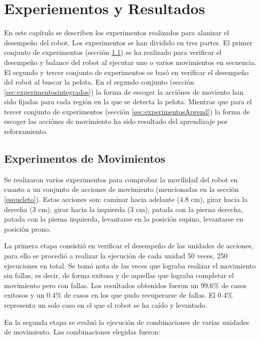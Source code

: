 \chapter{Experiementos y Resultados}\label{chapter:resultados}
En este capítulo se describen los experimentos realizados para alanizar el desempeño del robot. Los experimentos se han dividido en tres partes. El primer conjunto de experimentos (sección \ref{sec:experimentosMov}) se ha realizado para verificar el desempeño y balance del robot al ejecutar uno o varios movimientos en secuencia. El segundo y tercer conjunto de experimentos se bas\'o en verificar el desempeño del robot al buscar la pelota. En el segundo conjunto (sección \ref{sec:experimentosintegrados}) la forma de escoger la acciónes de moviento han sido fijadas para cada región en la que se detecta la pelota. Mientras que para el tercer conjunto de experimentos (secci\'on \ref{sec:experimentosAprend}) la forma de escoger las acci\'ones de movimiento ha sido resultado del aprendizaje por reforzamiento. 
 
\section{Experimentos de Movimientos}\label{sec:experimentosMov}

Se realizaron varios experimentos para comprobar la movilidad del robot en cuanto a un conjunto de acciones de movimiento (mencionadas en la sección \ref{esqueleto}). Estas acciones son: caminar hacia adelante (4.8 cm), girar hacia la derecha (3 cm), girar hacia la izquierda (3 cm), patada con la pierna derecha, patada con la pierna izquierda, levantarse en la posición supino, levantarse en posición prono.

La primera etapa consistió en verificar el desempeño de las unidades de acciones, para ello se procedió a realizar la ejecución de cada unidad 50 veces, 250 ejecuciones en total. Se tomó nota de las veces que lograba realizar el movimiento sin fallas, es decir, de forma exitosa y de aquellas que lograba completar el movimiento pero con fallas. Los resultados obtenidos fueron un 99.6\% de casos exitosos y un 0.4\% de casos en los que pudo recuperarse de fallas. El 0.4\% representa un solo caso en el que el robot se ha caído y levantado.  

En la segunda etapa se evalu\'o la ejecuci\'on de combinaciones de varias unidades de movimiento. Las combinaciones elegidas fueron: 

